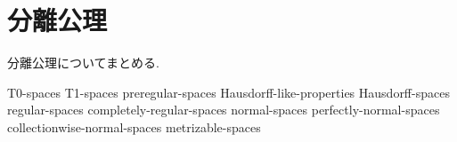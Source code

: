 \documentclass[uplatex, dvipdfmx, a4paper, 12pt, class=jsbook, crop=false]{standalone}
\begin{document}
\chapter{分離公理}
\label{chap:separation-axioms}

分離公理についてまとめる.

{T0-spaces}
{T1-spaces}
{preregular-spaces}
{Hausdorff-like-properties}
{Hausdorff-spaces}
{regular-spaces}
{completely-regular-spaces}
{normal-spaces}
{perfectly-normal-spaces}
{collectionwise-normal-spaces}
{metrizable-spaces}
\end{document}
